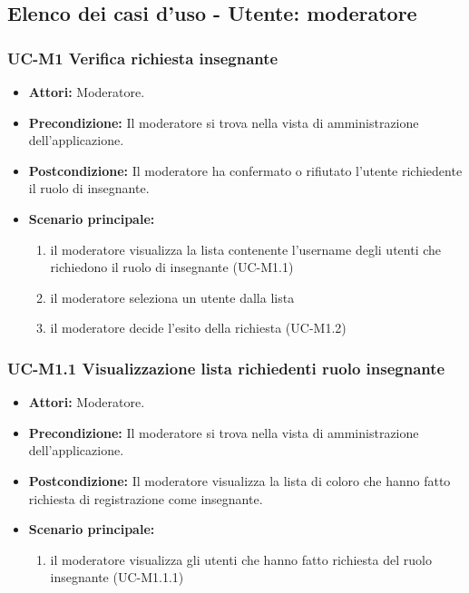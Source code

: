\subsection{Elenco dei casi d'uso - Utente: moderatore}	
\subsubsection{UC-M1 Verifica richiesta insegnante}
		\begin{itemize}
			\item \textbf{Attori:} Moderatore.
			\item \textbf{Precondizione:} Il moderatore si trova nella vista di amministrazione dell'applicazione.
			\item \textbf{Postcondizione:} Il moderatore ha confermato o rifiutato l'utente richiedente il ruolo di insegnante.
			\item \textbf{Scenario principale:}
				\begin{enumerate}
					\item il moderatore visualizza la lista contenente l'username degli utenti che richiedono il ruolo di insegnante (UC-M1.1)
					\item il moderatore seleziona un utente dalla lista
					\item il moderatore decide l'esito della richiesta (UC-M1.2)
				\end{enumerate}
		\end{itemize}		
		
\subsubsection{UC-M1.1 Visualizzazione lista richiedenti ruolo insegnante}
	\begin{itemize}
		\item \textbf{Attori:} Moderatore.
		\item \textbf{Precondizione:} Il moderatore si trova nella vista di amministrazione dell'applicazione.
		\item \textbf{Postcondizione:} Il moderatore visualizza la lista di coloro che hanno fatto richiesta di registrazione come insegnante.
		\item \textbf{Scenario principale:}
			\begin{enumerate}
				\item il moderatore visualizza gli utenti che hanno fatto richiesta del ruolo insegnante (UC-M1.1.1)
			\end{enumerate}
	\end{itemize}
		
